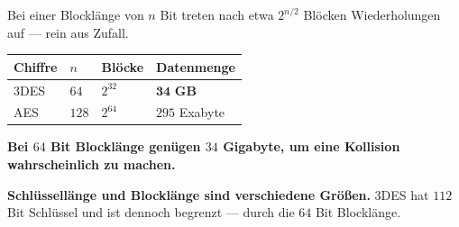 \begin{warnung}
Bei einer Blocklänge von $n$ Bit treten nach etwa $2^{n/2}$ Blöcken Wiederholungen auf --- rein aus Zufall.

\begin{center}
{\small
\renewcommand{\arraystretch}{1.48}
\begin{tabular}{@{}P{2.2cm}P{1.8cm}P{2.2cm}P{2.2cm}@{}}
\toprule
\textbf{Chiffre} & $n$ & \textbf{Blöcke} & \textbf{Datenmenge}\\
\midrule
3DES & $64$ & $2^{32}$ & $\mathbf{34}$ \textbf{GB}\\
AES & $128$ & $2^{64}$ & $295$ Exabyte\\
\bottomrule
\end{tabular}}
\end{center}

\begin{center}
\begin{minipage}{0.9\textwidth}
\textbf{Bei $64$ Bit Blocklänge genügen $34$ Gigabyte, um eine Kollision wahrscheinlich zu machen.}
\end{minipage}
\end{center}

\begin{center}
\begin{minipage}{0.88\textwidth}
\end{minipage}
\end{center}

\begin{center}
\begin{minipage}{0.9\textwidth}
\textbf{Schlüssellänge und Blocklänge sind verschiedene Größen.} $3$DES hat $112$ Bit Schlüssel und ist dennoch begrenzt --- durch die $64$ Bit Blocklänge.
\end{minipage}
\end{center}
\end{warnung}

